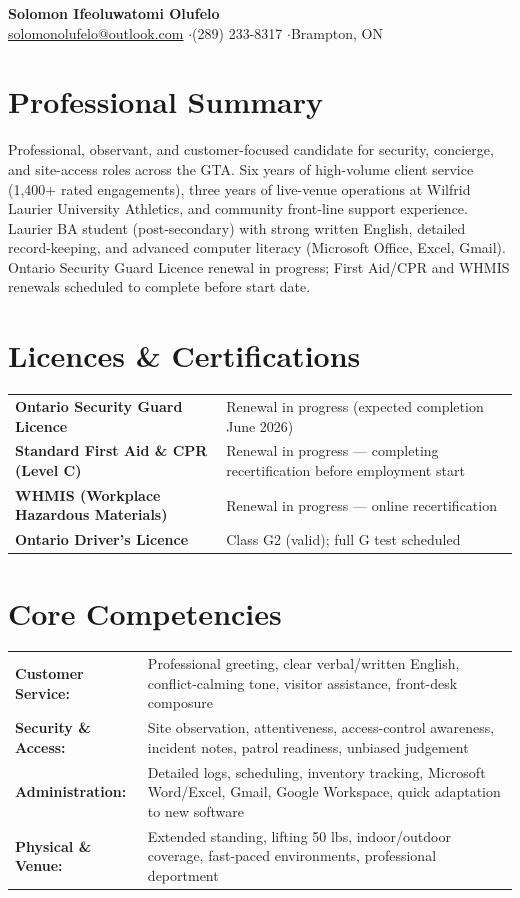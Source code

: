 \documentclass[a4paper,10pt]{article}
\begin{document}
\begin{center}
    {\LARGE \textbf{Solomon Ifeoluwatomi Olufelo}} \\[2pt]
    \href{mailto:solomonolufelo@outlook.com}{solomonolufelo@outlook.com} \enspace$\cdot$\enspace (289) 233-8317 \enspace$\cdot$\enspace Brampton, ON
\end{center}

\section*{Professional Summary}
Professional, observant, and customer-focused candidate for security, concierge, and site-access roles across the GTA. Six years of high-volume client service (1,400+ rated engagements), three years of live-venue operations at Wilfrid Laurier University Athletics, and community front-line support experience. Laurier BA student (post-secondary) with strong written English, detailed record-keeping, and advanced computer literacy (Microsoft Office, Excel, Gmail). Ontario Security Guard Licence renewal in progress; First Aid/CPR and WHMIS renewals scheduled to complete before start date.

\section*{Licences \& Certifications}
\begin{tabularx}{\textwidth}{@{}lX@{}}
\textbf{Ontario Security Guard Licence} & Renewal in progress (expected completion June 2026) \\
\textbf{Standard First Aid \& CPR (Level C)} & Renewal in progress — completing recertification before employment start \\
\textbf{WHMIS (Workplace Hazardous Materials)} & Renewal in progress — online recertification \\
\textbf{Ontario Driver's Licence} & Class G2 (valid); full G test scheduled \\
\end{tabularx}

\section*{Core Competencies}
\begin{tabularx}{\textwidth}{@{}lX@{}}
\textbf{Customer Service:} & Professional greeting, clear verbal/written English, conflict-calming tone, visitor assistance, front-desk composure \\
\textbf{Security \& Access:} & Site observation, attentiveness, access-control awareness, incident notes, patrol readiness, unbiased judgement \\
\textbf{Administration:} & Detailed logs, scheduling, inventory tracking, Microsoft Word/Excel, Gmail, Google Workspace, quick adaptation to new software \\
\textbf{Physical \& Venue:} & Extended standing, lifting 50 lbs, indoor/outdoor coverage, fast-paced environments, professional deportment \\
\end{tabularx}
\end{document}
